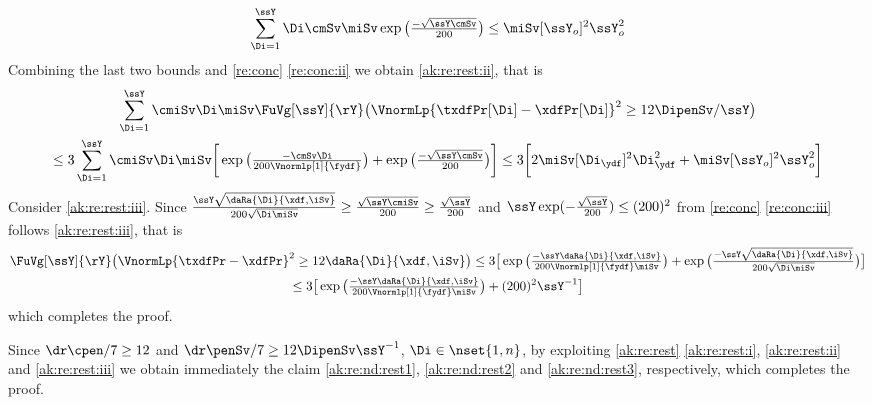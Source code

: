 \begin{pro}
\begin{displaymath}
 \sum_{\Di=1}^{\ssY}\Di\cmSv\miSv\exp\big(\tfrac{-\sqrt{\ssY\cmSv}}{200}\big)\leq \miSv[\ssY_{o}]^2\ssY_{o}^2
\end{displaymath}
Combining the last two bounds and \cref{re:conc} \ref{re:conc:ii} we obtain \ref{ak:re:rest:ii}, that is 
\begin{multline*}
\sum_{\Di=1}^{\ssY}\cmiSv \Di \miSv\FuVg[\ssY]{\rY}\big(\VnormLp{\txdfPr[\Di]-\xdfPr[\Di]}^2\geq12\DipenSv/\ssY\big)\\\hfill\leq 3\sum_{\Di=1}^{\ssY}\cmiSv \Di \miSv\bigg[\exp\big(\tfrac{-\cmSv\Di}{200\Vnormlp[1]{\fydf}}\big)+\exp\big(\tfrac{-\sqrt{\ssY\cmSv}}{200}\big)
\bigg]
\leq3\bigg[2\miSv[\Di_{\ydf}]^2\Di_{\ydf}^2+\miSv[\ssY_{o}]^2\ssY_{o}^2\bigg]
\end{multline*}
Consider \ref{ak:re:rest:iii}. Since
$\tfrac{\ssY\sqrt{\daRa{\Di}{\xdf,\iSv}}}{200\sqrt{\Di\miSv}}\geq\tfrac{\sqrt{\ssY\cmiSv}}{200}\geq\tfrac{\sqrt{\ssY}}{200}$
and $\ssY\exp(-\tfrac{\sqrt{\ssY}}{200})\leq(200)^2$ 
from \cref{re:conc} \ref{re:conc:iii} follows \ref{ak:re:rest:iii}, that is 
\begin{multline*}
 \FuVg[\ssY]{\rY}\big(\VnormLp{\txdfPr-\xdfPr}^2 \geq 12\daRa{\Di}{\xdf,\iSv}\big)\leq 
    3 \big[\exp\big(\tfrac{-\ssY\daRa{\Di}{\xdf,\iSv}}{200\Vnormlp[1]{\fydf}\miSv}\big)
    +\exp\big(\tfrac{-\ssY\sqrt{\daRa{\Di}{\xdf,\iSv}}}{200\sqrt{\Di\miSv}}\big)\big]\\\leq 3 \big[\exp\big(\tfrac{-\ssY\daRa{\Di}{\xdf,\iSv}}{200\Vnormlp[1]{\fydf}\miSv}\big)
    +(200)^2\ssY^{-1}\big] 
\end{multline*}
which  completes the proof.\proEnd\end{pro}
\begin{pro}
  Since $\dr\cpen/7\geq 12$ and $\dr\penSv/7\geq12\DipenSv\ssY^{-1}$,
  $\Di\in\nset{1,n}$, by exploiting \cref{ak:re:rest}
  \ref{ak:re:rest:i}, \ref{ak:re:rest:ii} and \ref{ak:re:rest:iii} we
  obtain immediately the claim \ref{ak:re:nd:rest1},
  \ref{ak:re:nd:rest2} and \ref{ak:re:nd:rest3}, respectively, which  completes the proof.
\proEnd\end{pro}
